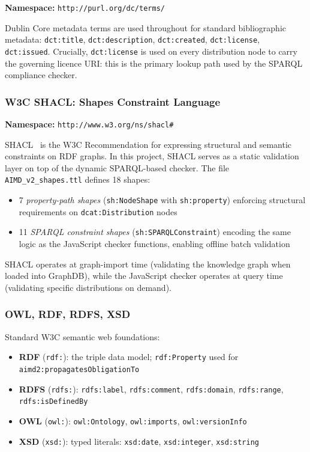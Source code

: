 \documentclass[12pt,a4paper]{article}
\begin{document}
\textbf{Namespace:} \texttt{http://purl.org/dc/terms/}

Dublin Core metadata terms are used throughout for standard bibliographic metadata: \texttt{dct:title}, \texttt{dct:description}, \texttt{dct:created}, \texttt{dct:license}, \texttt{dct:issued}. Crucially, \texttt{dct:license} is used on every distribution node to carry the governing licence URI: this is the primary lookup path used by the SPARQL compliance checker.

\subsubsection{W3C SHACL: Shapes Constraint Language}

\textbf{Namespace:} \texttt{http://www.w3.org/ns/shacl\#}

SHACL~\cite{shacl} is the W3C Recommendation for expressing structural and semantic constraints on RDF graphs. In this project, SHACL serves as a static validation layer on top of the dynamic SPARQL-based checker. The file \texttt{AIMD\_v2\_shapes.ttl} defines 18 shapes:

\begin{itemize}[noitemsep]
  \item 7 \emph{property-path shapes} (\texttt{sh:NodeShape} with \texttt{sh:property}) enforcing structural requirements on \texttt{dcat:Distribution} nodes
  \item 11 \emph{SPARQL constraint shapes} (\texttt{sh:SPARQLConstraint}) encoding the same logic as the JavaScript checker functions, enabling offline batch validation
\end{itemize}

SHACL operates at graph-import time (validating the knowledge graph when loaded into GraphDB), while the JavaScript checker operates at query time (validating specific distributions on demand).

\subsubsection{OWL, RDF, RDFS, XSD}

Standard W3C semantic web foundations:
\begin{itemize}[noitemsep]
  \item \textbf{RDF} (\texttt{rdf:}): the triple data model; \texttt{rdf:Property} used for  \linebreak\texttt{aimd2:propagatesObligationTo}
  \item \textbf{RDFS} (\texttt{rdfs:}): \texttt{rdfs:label}, \texttt{rdfs:comment}, \texttt{rdfs:domain}, \texttt{rdfs:range}, \texttt{rdfs:isDefinedBy}
  \item \textbf{OWL} (\texttt{owl:}): \texttt{owl:Ontology}, \texttt{owl:imports}, \texttt{owl:versionInfo}
  \item \textbf{XSD} (\texttt{xsd:}): typed literals: \texttt{xsd:date}, \texttt{xsd:integer}, \texttt{xsd:string}
\end{itemize}
\end{document}
